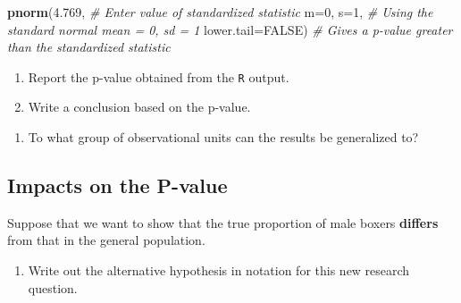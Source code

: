 \documentclass[
]{report}
\newenvironment{Shaded}{\begin{snugshade}}{\end{snugshade}}
\newcommand{\AttributeTok}[1]{\textcolor[rgb]{0.13,0.29,0.53}{#1}}
\newcommand{\CommentTok}[1]{\textcolor[rgb]{0.56,0.35,0.01}{\textit{#1}}}
\newcommand{\ConstantTok}[1]{\textcolor[rgb]{0.56,0.35,0.01}{#1}}
\newcommand{\DecValTok}[1]{\textcolor[rgb]{0.00,0.00,0.81}{#1}}
\newcommand{\FloatTok}[1]{\textcolor[rgb]{0.00,0.00,0.81}{#1}}
\newcommand{\FunctionTok}[1]{\textcolor[rgb]{0.13,0.29,0.53}{\textbf{#1}}}
\newcommand{\NormalTok}[1]{#1}
\providecommand{\tightlist}{%
  \setlength{\itemsep}{0pt}\setlength{\parskip}{0pt}}
\begin{document}
\begin{Shaded}
\begin{Highlighting}[]
\FunctionTok{pnorm}\NormalTok{(}\FloatTok{4.769}\NormalTok{, }\CommentTok{\# Enter value of standardized statistic}
      \AttributeTok{m=}\DecValTok{0}\NormalTok{, }\AttributeTok{s=}\DecValTok{1}\NormalTok{, }\CommentTok{\# Using the standard normal mean = 0, sd = 1}
      \AttributeTok{lower.tail=}\ConstantTok{FALSE}\NormalTok{) }\CommentTok{\# Gives a p{-}value greater than the standardized statistic}
\end{Highlighting}
\end{Shaded}

\begin{enumerate}
\def\labelenumi{\arabic{enumi}.}
\setcounter{enumi}{6}
\item
  Report the p-value obtained from the \texttt{R} output.
  \vspace{0.3in}
\item
  Write a conclusion based on the p-value.
\end{enumerate}

\vspace{0.6in}

\begin{enumerate}
\def\labelenumi{\arabic{enumi}.}
\setcounter{enumi}{8}
\tightlist
\item
  To what group of observational units can the results be generalized to?
\end{enumerate}

\vspace{0.4in}

\subsection*{Impacts on the P-value}\label{impacts-on-the-p-value}

Suppose that we want to show that the true proportion of male boxers \textbf{differs} from that in the general population.

\begin{enumerate}
\def\labelenumi{\arabic{enumi}.}
\setcounter{enumi}{9}
\tightlist
\item
  Write out the alternative hypothesis in notation for this new research question.
\end{enumerate}

\vspace{0.3in}
\end{document}
